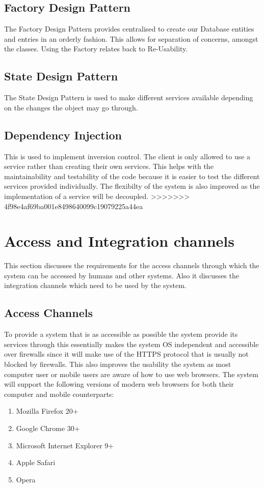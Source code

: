\documentclass[12pt]{article}
\begin{document}
\subsection{Factory Design Pattern}
The Factory Design Pattern provides centralised to create our Database entities and entries in an orderly fashion. This allows for separation of concerns, amongst the classes. Using the Factory relates back to Re-Usability. %
\subsection{State Design Pattern}
The State Design Pattern is used to make different services available depending on the changes the object may go through. 
\subsection{Dependency Injection}
This is used to implement inversion control. The client is only allowed to use a service rather than creating their own services. This helps with the maintainability and testability of the code because it is easier to test the different services provided individually. The flexibilty of the system is also improved as the implementation of a service will be decoupled. 
>>>>>>> 4f98e4af69ba001e8498640099c19079225a44ea
\section{Access and Integration channels}
This section discusses the requirements for the access channels through which the system can be accessed by humans and other systems. Also it discusses the integration channels which need to be used by the system. 

\subsection{Access Channels}
To provide a system that is as accessible as possible the system provide its services through this essentially makes the system OS independent and accessible over firewalls since it will make use of the HTTPS protocol that is usually not blocked by firewalls. This also improves the usability the system as most computer user or mobile users are aware of how to use web browsers. The system will support the following versions of modern web browsers for both their computer and mobile counterparts:
\begin{enumerate}
\item Mozilla Firefox 20+
\item Google Chrome 30+
\item Microsoft Internet Explorer 9+
\item Apple Safari
\item Opera
\end{enumerate}
\end{document}

